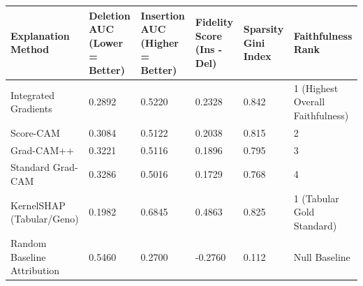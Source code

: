 \begin{tabular}{llllll}
\toprule
Explanation Method & Deletion AUC (Lower = Better) & Insertion AUC (Higher = Better) & Fidelity Score (Ins - Del) & Sparsity Gini Index & Faithfulness Rank \\
\midrule
Integrated Gradients & 0.2892 & 0.5220 & 0.2328 & 0.842 & 1 (Highest Overall Faithfulness) \\
Score-CAM & 0.3084 & 0.5122 & 0.2038 & 0.815 & 2 \\
Grad-CAM++ & 0.3221 & 0.5116 & 0.1896 & 0.795 & 3 \\
Standard Grad-CAM & 0.3286 & 0.5016 & 0.1729 & 0.768 & 4 \\
KernelSHAP (Tabular/Geno) & 0.1982 & 0.6845 & 0.4863 & 0.825 & 1 (Tabular Gold Standard) \\
Random Baseline Attribution & 0.5460 & 0.2700 & -0.2760 & 0.112 & Null Baseline \\
\bottomrule
\end{tabular}
